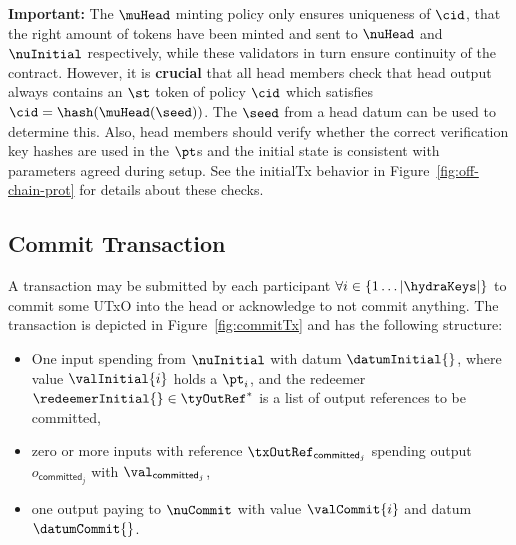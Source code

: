 \noindent \textbf{Important:} The $\muHead$ minting policy only ensures
uniqueness of $\cid$, that the right amount of tokens have been minted and sent
to $\nuHead$ and $\nuInitial$ respectively, while these validators in turn
ensure continuity of the contract. However, it is \textbf{crucial} that all head
members check that head output always contains an $\st$ token of policy $\cid$
which satisfies $\cid = \hash(\muHead(\seed))$. The $\seed$ from a head datum
can be used to determine this. Also, head members should verify whether the
correct verification key hashes are used in the $\pt$s and the initial state is
consistent with parameters agreed during setup. See the initialTx behavior in
Figure~\ref{fig:off-chain-prot} for details about these checks.\\

\subsection{Commit Transaction}\label{sec:commit-tx}

A \mtxCom{} transaction may be submitted by each participant
$\forall i \in \{1 \dots |\hydraKeys|\}$ to commit some UTxO into the head or
acknowledge to not commit anything. The transaction is depicted in
Figure~\ref{fig:commitTx} and has the following structure:
\begin{itemize}
  \item One input spending from $\nuInitial$ with datum $\datumInitial{}$,
  where value $\valInitial{i}$ holds a $\pt_i$, and the redeemer
  $\redeemerInitial{} \in \tyOutRef^{*}$ is a list of output
  references to be committed,
  \item zero or more inputs with reference $\txOutRef_{\mathsf{committed}_{j}}$
  spending output $o_{\mathsf{committed}_{j}}$ with
  $\val_{\mathsf{committed}_{j}}$,
  \item one output paying to $\nuCommit$ with value $\valCommit{i}$ and datum $\datumCommit{}$.
\end{itemize}

